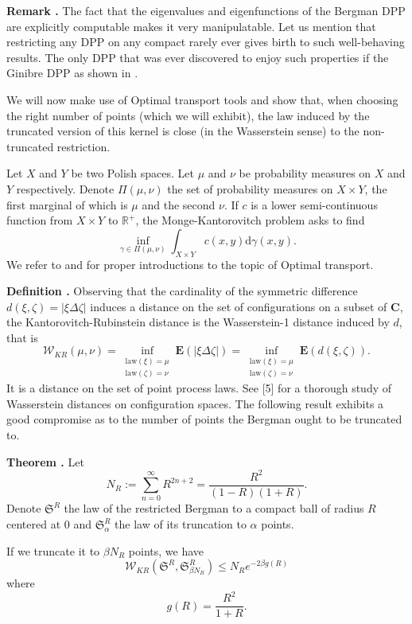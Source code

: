 \documentclass[11pt]{article}
\newcounter{cnt}
\newcommand{\cnt}{\thecnt \stepcounter{cnt}}
\begin{document}
\textbf{Remark \cnt.} The fact that the eigenvalues and eigenfunctions of the Bergman DPP are explicitly computable makes it very manipulatable. Let us mention that restricting any DPP on any compact rarely ever gives birth to such well-behaving results. The only DPP that was ever discovered to enjoy such properties if the Ginibre DPP as shown in \cite{DecreusefondMoroz2021}.

We will now make use of Optimal transport tools and show that, when choosing the right number of points (which we will exhibit), the law induced by the truncated version of this kernel is close (in the Wasserstein sense) to the non-truncated restriction.

Let $X$ and $Y$ be two Polish spaces. Let $\mu$ and $\nu$ be probability measures on $X$ and $Y$ respectively. Denote $\Pi(\mu, \nu)$ the set of probability measures on $X \times Y$, the first marginal of which is $\mu$ and the second $\nu$. If $c$ is a lower semi-continuous function from $X \times Y$ to $\mathbb{R}^+$, the Monge-Kantorovitch problem asks to find
\[
\inf_{\gamma \in \Pi(\mu,\nu)} \int_{X \times Y} c(x,y) \mathrm d\gamma(x,y).
\]
We refer to \cite{Villani2021} and \cite{Villani2009} for proper introductions to the topic of Optimal transport.

\textbf{Definition \cnt.} Observing that the cardinality of the symmetric difference $d(\xi, \zeta) = |\xi \Delta \zeta|$ induces a distance on the set of configurations on a subset of $\mathbf{C}$, the Kantorovitch-Rubinstein distance is the Wasserstein-1 distance induced by $d$, that is
\[
\mathcal{W}_{KR}(\mu, \nu) = \inf_{\substack{\text{law}(\xi)=\mu \\ \text{law}(\zeta)=\nu}} \mathbf{E}(|\xi \Delta \zeta|) = \inf_{\substack{\text{law}(\xi)=\mu \\ \text{law}(\zeta)=\nu}} \mathbf{E}(d(\xi, \zeta)).
\]
It is a distance on the set of point process laws. See [5] for a thorough study of Wasserstein distances on configuration spaces. The following result exhibits a good compromise as to the number of points the Bergman ought to be truncated to.

\textbf{Theorem \cnt.} Let
\[
N_R := \sum_{n=0}^\infty R^{2n+2} = \frac{R^2}{(1-R)(1+R)}.
\]
Denote $\mathfrak{S}^R$ the law of the restricted Bergman to a compact ball of radius $R$ centered at 0 and $\mathfrak{S}_\alpha^R$ the law of its truncation to $\alpha$ points.

If we truncate it to $\beta N_R$ points, we have
\begin{equation}
\mathcal{W}_{KR}(\mathfrak{S}^R, \mathfrak{S}_{\beta N_R}^R) \leqslant N_R e^{-2\beta g(R)}
\end{equation}
where
\[
g(R) = \frac{R^2}{1+R}.
\]
\end{document}
